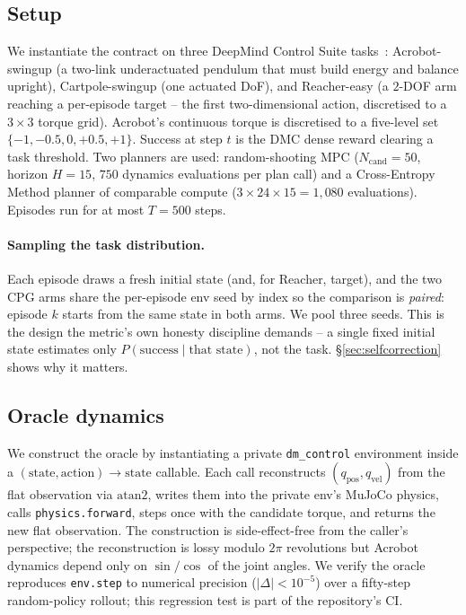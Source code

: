 \documentclass[10pt,letterpaper]{article}
\begin{document}
\subsection{Setup}

We instantiate the contract on three DeepMind Control Suite tasks~\citep{tassa2018dmc,tunyasuvunakool2020dmcontrol}: Acrobot-swingup (a two-link underactuated pendulum that must build energy and balance upright), Cartpole-swingup (one actuated DoF), and Reacher-easy (a $2$-DOF arm reaching a per-episode target -- the first two-dimensional action, discretised to a $3 \times 3$ torque grid). Acrobot's continuous torque is discretised to a five-level set $\{-1, -0.5, 0, +0.5, +1\}$. Success at step $t$ is the DMC dense reward clearing a task threshold. Two planners are used: random-shooting MPC ($N_{\mathrm{cand}} = 50$, horizon $H = 15$, $750$ dynamics evaluations per plan call) and a Cross-Entropy Method planner of comparable compute ($3 \times 24 \times 15 = 1{,}080$ evaluations). Episodes run for at most $T = 500$ steps.

\paragraph{Sampling the task distribution.} Each episode draws a fresh initial state (and, for Reacher, target), and the two CPG arms share the per-episode env seed by index so the comparison is \emph{paired}: episode $k$ starts from the same state in both arms. We pool three seeds. This is the design the metric's own honesty discipline demands -- a single fixed initial state estimates only $P(\text{success} \mid \text{that state})$, not the task. \S\ref{sec:selfcorrection} shows why it matters.

\subsection{Oracle dynamics}

We construct the oracle by instantiating a private \texttt{dm\_control} environment inside a $(\mathrm{state}, \mathrm{action}) \to \mathrm{state}$ callable. Each call reconstructs $(q_{\mathrm{pos}}, q_{\mathrm{vel}})$ from the flat observation via $\mathrm{atan2}$, writes them into the private env's MuJoCo physics, calls \texttt{physics.forward}, steps once with the candidate torque, and returns the new flat observation. The construction is side-effect-free from the caller's perspective; the reconstruction is lossy modulo $2\pi$ revolutions but Acrobot dynamics depend only on $\sin/\cos$ of the joint angles. We verify the oracle reproduces \texttt{env.step} to numerical precision ($|\Delta| < 10^{-5}$) over a fifty-step random-policy rollout; this regression test is part of the repository's CI.
\end{document}
